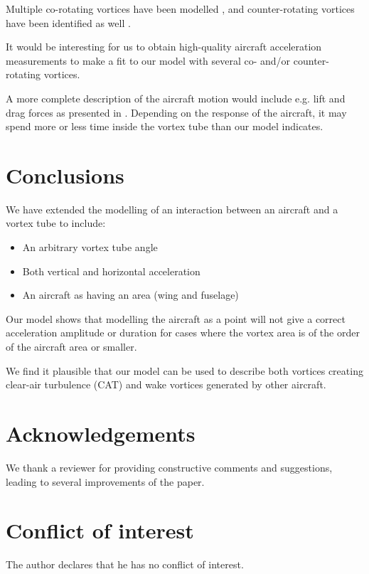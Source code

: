 \documentclass[smallextended]{svjour3}       %
\begin{document}
Multiple co-rotating vortices have been modelled \citep{parks_a,mehta_a}, and counter-rotating vortices have been identified as well \citep{misaka_a}.

It would be interesting for us to obtain high-quality aircraft acceleration measurements to make a fit to our model with several co- and/or counter-rotating vortices.

A more complete description of the aircraft motion would include e.g. lift and drag forces as presented in \citep{fischenberg_a,schwarz_a}. Depending on the response of the aircraft, it may spend more or less time inside the vortex tube than our model indicates.

\section{Conclusions}

We have extended the modelling of an interaction between an aircraft and a vortex tube to include:

\begin{itemize}
\item An arbitrary vortex tube angle
\item Both vertical and horizontal acceleration
\item An aircraft as having an area (wing and fuselage)
\end{itemize}

Our model shows that modelling the aircraft as a point will not give a correct acceleration amplitude or duration for cases where the vortex area is of the order of the aircraft area or smaller.

We find it plausible that our model can be used to describe both vortices creating clear-air turbulence (CAT) and wake vortices generated by other aircraft.

\section*{Acknowledgements}

We thank a reviewer for providing constructive comments and suggestions, leading to several improvements of the paper.

\section*{Conflict of interest}

The author declares that he has no conflict of interest.



\end{document}
